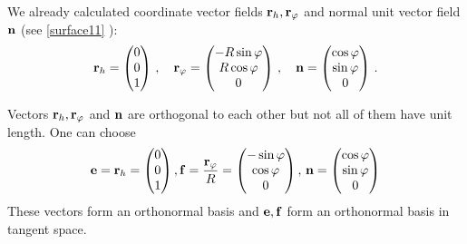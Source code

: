 \documentclass[12pt]{article}
\theoremstyle{theorem}
\numberwithin{equation}{section}
\begin{document}
{ We already calculated coordinate vector fields ${\bf r}_h,{\bf r}_\varphi$ and normal unit vector field
${\bf n}$ (see \eqref{surface11} ):
 \begin{equation}\label{surface115}
    {\bf r}_h=
  \begin{pmatrix}
        0\\
        0\\
        1\\
   \end{pmatrix}\,,
\quad
  {\bf r}_\varphi=\begin{pmatrix}
        -R\sin\varphi\\
        R\cos\varphi\\
          0\\
   \end{pmatrix}\,,\quad
      {\bf n}=\begin{pmatrix}
        \cos \varphi\cr
        \sin\varphi\cr
        0\cr
   \end{pmatrix}\,.
\end{equation}

Vectors ${\bf r}_h,{\bf r}_\varphi$ and ${\bf n}$ are orthogonal to each other but not all of them have unit length. One can choose
           \begin{equation}\label{nonholonombasisfor cylinder}
        {\bf e}={\bf r}_h=  \begin{pmatrix}
        0\cr
        0\cr
        1\cr
   \end{pmatrix},
   {\bf f}={{\bf r}_\varphi\over R}=\begin{pmatrix}
        -\sin\varphi\cr
        \cos\varphi\cr
          0\cr
   \end{pmatrix},\,{\bf n}=\begin{pmatrix}
        \cos \varphi\cr
        \sin\varphi\cr
        0\cr
   \end{pmatrix}
           \end{equation}
   These vectors form an orthonormal basis and ${\bf e},{\bf f}$  form an orthonormal basis in tangent space.

}
\end{document}
